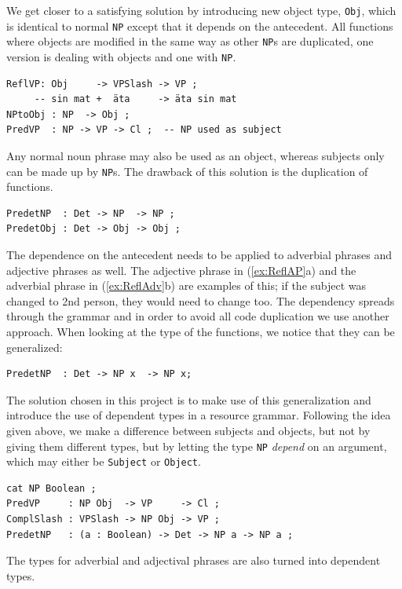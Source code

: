 \documentclass{report}
\begin{document}
We get closer to a satisfying solution by introducing new object type,
\verb_Obj_, which is
identical to normal \verb_NP_ except that it depends on 
the antecedent. All functions where objects are modified in the same way
as other \verb-NP-s are duplicated, one version is dealing 
with objects and one with \verb-NP-.
\begin{verbatim}
ReflVP: Obj     -> VPSlash -> VP ;
     -- sin mat +  äta     -> äta sin mat 
NPtoObj : NP  -> Obj ;
PredVP  : NP -> VP -> Cl ;  -- NP used as subject
\end{verbatim}
Any normal noun phrase may also be used as an object, whereas subjects only
can be made up by \verb-NP-s.
The drawback of this solution is the duplication of functions.
\begin{verbatim}
PredetNP  : Det -> NP  -> NP ;
PredetObj : Det -> Obj -> Obj ;
\end{verbatim}
The dependence on the antecedent needs to be applied to adverbial phrases and
adjective phrases as well. The adjective phrase in (\ref{ex:ReflAP}a) and
the adverbial phrase in (\ref{ex:ReflAdv}b) are examples of this; if the
subject was changed to 2nd person, they  would need to change too.
 \label{ex:ReflAP2} \label{ex:ReflAdv2}
The dependency spreads through the grammar and in order to avoid all code
duplication we use another approach.
When looking at the type of
the functions, we notice that they can be generalized:
\begin{verbatim}
PredetNP  : Det -> NP x  -> NP x;
\end{verbatim}
The solution chosen in this project is to make use of this generalization and
introduce the use of dependent types in a resource grammar.
Following the idea given above, we make a difference between subjects and objects, but not
by giving them different types, but by %
letting the type \verb-NP- \textit{depend} on an argument, which may either be \verb-Subject- or
\verb-Object-.
\begin{verbatim}
cat NP Boolean ;
PredVP     : NP Obj  -> VP     -> Cl ;
ComplSlash : VPSlash -> NP Obj -> VP ;
PredetNP   : (a : Boolean) -> Det -> NP a -> NP a ;
\end{verbatim}
The types for adverbial and adjectival phrases are also turned into dependent
types.
\end{document}
